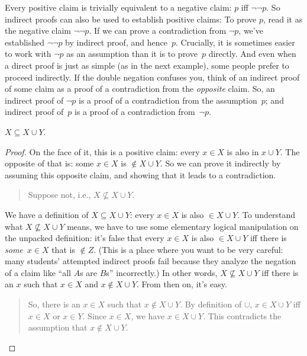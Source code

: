 \documentclass[../../../include/open-logic-section]{subfiles}
\begin{document}
Every positive claim is trivially equivalent to a negative claim: $p$
iff $\lnot\lnot p$.  So indirect proofs can also be used to establish
positive claims: To prove $p$, read it as the negative claim
$\lnot\lnot p$. If we can prove a contradiction from $\lnot p$, we've
established $\lnot\lnot p$ by indirect proof, and
hence~$p$. Crucially, it is sometimes easier to work with $\lnot p$ as
an assumption than it is to prove~$p$ directly.  And even when a
direct proof is just as simple (as in the next example), some people
prefer to proceed indirectly.  If the double negation confuses you,
think of an indirect proof of some claim as a proof of a contradiction
from the \emph{opposite} claim. So, an indirect proof of $\lnot p$ is a proof
of a contradiction from the assumption~$p$; and indirect proof of~$p$
is a proof of a contradiction from~$\lnot p$.

\begin{prop}
$X \subseteq X \cup Y$.
\end{prop}

\begin{proof}
On the face of it, this is a positive claim: every $x \in X$ is also
in $x \cup Y$.  The opposite of that is: some $x \in X$ is $\notin X
\cup Y$. So we can prove it indirectly by assuming this opposite
claim, and showing that it leads to a contradiction.
\begin{quote}
  Suppose not, i.e., $X \nsubseteq X \cup Y$.
\end{quote}
We have a definition of $X \subseteq X \cup Y$: every $x \in X$ is
also $\in X \cup Y$.  To understand what $X \nsubseteq X \cup Y$
means, we have to use some elementary logical manipulation on the
unpacked definition: it's false that every $x \in X$ is also $\in X
\cup Y$ iff there is \emph{some}~$x \in X$ that is $\notin Z$.  (This
is a place where you want to be very careful: many students' attempted
indirect proofs fail because they analyze the negation of a claim like
``all $A$s are $B$s'' incorrectly.) In other words, $X \nsubseteq X
\cup Y$ iff there is an $x$ such that $x \in X$ and $x \notin X \cup
Y$. From then on, it's easy.
\begin{quote}
So, there is an $x \in X$ such that $x \notin X \cup Y$.  By
definition of $\cup$, $x \in X \cup Y$ iff $x \in X$ or $x \in
Y$. Since $x \in X$, we have $x \in X \cup Y$. This contradicts the
assumption that $x \notin X \cup Y$. \qedhere
\end{quote}
\end{proof}
\end{document}
